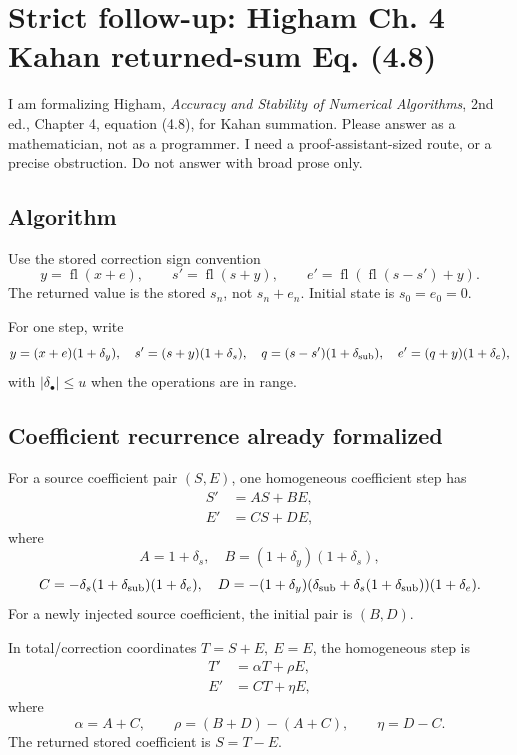 \documentclass{article}
\begin{document}
\section*{Strict follow-up: Higham Ch. 4 Kahan returned-sum Eq. (4.8)}

I am formalizing Higham, \emph{Accuracy and Stability of Numerical
Algorithms}, 2nd ed., Chapter 4, equation (4.8), for Kahan summation.  Please
answer as a mathematician, not as a programmer.  I need a proof-assistant-sized
route, or a precise obstruction.  Do not answer with broad prose only.

\subsection*{Algorithm}

Use the stored correction sign convention
\[
  y=\operatorname{fl}(x+e),\qquad
  s'=\operatorname{fl}(s+y),\qquad
  e'=\operatorname{fl}(\operatorname{fl}(s-s')+y).
\]
The returned value is the stored \(s_n\), not \(s_n+e_n\).  Initial state is
\(s_0=e_0=0\).

For one step, write
\[
 y=(x+e)(1+\delta_y),\quad
 s'= (s+y)(1+\delta_s),\quad
 q=(s-s')(1+\delta_{\rm sub}),\quad
 e'=(q+y)(1+\delta_e),
\]
with \(|\delta_\bullet|\le u\) when the operations are in range.

\subsection*{Coefficient recurrence already formalized}

For a source coefficient pair \((S,E)\), one homogeneous coefficient step has
\[
\begin{aligned}
S' &= A S + B E,\\
E' &= C S + D E,
\end{aligned}
\]
where
\[
A=1+\delta_s,\quad
B=(1+\delta_y)(1+\delta_s),
\]
\[
C=-\delta_s(1+\delta_{\rm sub})(1+\delta_e),\quad
D=-(1+\delta_y)(\delta_{\rm sub}+\delta_s(1+\delta_{\rm sub}))(1+\delta_e).
\]
For a newly injected source coefficient, the initial pair is \((B,D)\).

In total/correction coordinates \(T=S+E,\ E=E\), the homogeneous step is
\[
\begin{aligned}
T' &= \alpha T + \rho E,\\
E' &= C T + \eta E,
\end{aligned}
\]
where
\[
\alpha=A+C,\qquad
\rho=(B+D)-(A+C),\qquad
\eta=D-C.
\]
The returned stored coefficient is \(S=T-E\).
\end{document}
